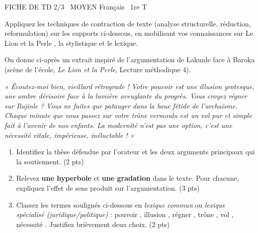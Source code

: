 \documentclass[11pt]{article}
\begin{document}
\begin{tcolorbox}[enhanced,colback=popink,colframe=popink,arc=10pt,boxrule=0pt,left=12pt,right=12pt,top=9pt,bottom=9pt]
{\color{white}\popxbold\small FICHE DE TD 2/3 \textbullet\ MOYEN \hfill Français \textbullet\ 1re T\par}
\end{tcolorbox}
\vspace{4pt}
\noindent Appliquez les techniques de contraction de texte (analyse structurelle, réduction, reformulation) sur les supports ci-dessous, en mobilisant vos connaissances sur \og Le Lion et la Perle \fg{}, la stylistique et le lexique.

\begin{exercice}
\label{exo:structure}
On donne ci-après un extrait inspiré de l'argumentation de Lakunle face à Baroka (scène de l'école, \textit{Le Lion et la Perle}, Lecture méthodique 4).

\textit{« Écoutez-moi bien, vieillard rétrograde ! Votre pouvoir est une illusion grotesque, une ombre dérisoire face à la lumière aveuglante du progrès. Vous croyez régner sur Ilujinle ? Vous ne faites que patauger dans la boue fétide de l'archaïsme. Chaque minute que vous passez sur votre trône vermoulu est un vol pur et simple fait à l'avenir de nos enfants. La modernité n'est pas une option, c'est une nécessité vitale, impérieuse, inéluctable ! »}

\begin{enumerate}
    \item Identifiez la thèse défendue par l'orateur et les deux arguments principaux qui la soutiennent. (2 pts)
    \item Relevez \textbf{une hyperbole} et \textbf{une gradation} dans le texte. Pour chacune, expliquez l'effet de sens produit sur l'argumentation. (3 pts)
    \item Classez les termes soulignés ci-dessous en \textit{lexique commun} ou \textit{lexique spécialisé (juridique/politique)} : \og pouvoir \fg{}, \og illusion \fg{}, \og régner \fg{}, \og trône \fg{}, \og vol \fg{}, \og nécessité \fg{}. Justifiez brièvement deux choix. (2 pts)
\end{enumerate}
\end{exercice}
\end{document}
